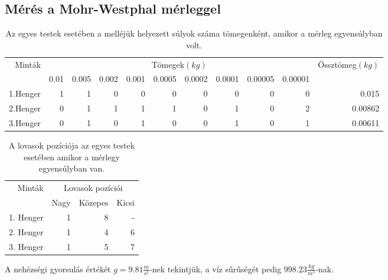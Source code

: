 \documentclass[10pt,pdftex]{report}
\begin{document}
\subsection*{Mérés a Mohr-Westphal mérleggel}
\begin{table}[H]
    \centering
    \begin{tabular}{|r|r|r|r|r|r|r|r|r|r|r|}
        \hline
        \multirow{2}{*}{Minták} & \multicolumn{9}{|c|}{Tömegek$(kg)$} & \multirow{2}{*}{Össztömeg$(kg)$} \\
        \cline{2-10}
        & 0.01 & 0.005 & 0.002 & 0.001 & 0.0005 & 0.0002 & 0.0001 & 0.00005 & 0.00001 & \\
        \hline
        1.Henger\footnotemark[6] & 1 & 1 & 0 & 0 & 0 & 0 & 0 & 0 & 0 & 0.015 \\
        \hline
        2.Henger\footnotemark[7] & 0 & 1 & 1 & 1 & 1 & 0 & 1 & 0 & 2 & 0.00862 \\
        \hline
        3.Henger\footnotemark[8] & 0 & 1 & 0 & 1 & 0 & 0 & 1 & 0 & 1 & 0.00611 \\
        \hline
    \end{tabular}
    \caption{Az egyes testek esetében a melléjük helyezett súlyok száma tömegenként, amikor a mérleg egyensúlyban volt.}
\end{table}
\begin{table}[H]
    \centering
    \begin{tabular}{|r|r|r|r|}
        \hline
        \multirow{2}{*}{Minták} & \multicolumn{3}{|c|}{Lovasok pozíciói} \\
        \cline{2-4}
        & Nagy & Közepes & Kicsi \\
        \hline
        1. Henger & 1 & 8 & - \\
        \hline
        2. Henger & 1 & 4 & 6 \\
        \hline
        3. Henger & 1 & 5 & 7 \\
        \hline
    \end{tabular}
    \caption{A lovasok pozíciója az egyes testek esetében amikor a mérlegy egyensúlyban van.}
\end{table}
A nehézségi gyorsulás értékét $g=9.81\frac{m}{s^2}$-nek tekintjük, a víz sűrűségét pedig $998.23\frac{kg}{m^3}$-nak. 
\end{document}
